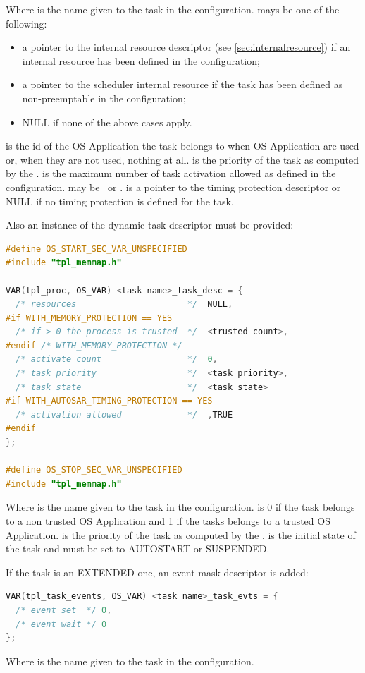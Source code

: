 Where  is the name given to the task in the configuration.  mays be one of the following:

\begin{itemize}
\item a pointer to the internal resource descriptor (see \ref{sec:internalresource}) if an internal resource has been defined in the configuration;
\item a pointer to the scheduler internal resource if the task has been defined as non-preemptable in the configuration;
\item NULL if none of the above cases apply.
\end{itemize}

 is the id of the OS Application the task belongs to when OS Application are used or, when they are not used, nothing at all.  is the priority of the task as computed by the \sysgen.  is the maximum number of task activation allowed as defined in the configuration.  may be \EXTENDED\ or \BASIC.  is a pointer to the timing protection descriptor or NULL if no timing protection is defined for the task.

Also an instance of the dynamic task descriptor must be provided:

\begin{lstlisting}[language=C]
#define OS_START_SEC_VAR_UNSPECIFIED
#include "tpl_memmap.h"

VAR(tpl_proc, OS_VAR) <task name>_task_desc = {
  /* resources                      */  NULL,
#if WITH_MEMORY_PROTECTION == YES
  /* if > 0 the process is trusted  */  <trusted count>,    
#endif /* WITH_MEMORY_PROTECTION */
  /* activate count                 */  0,
  /* task priority                  */  <task priority>,
  /* task state                     */  <task state>
#if WITH_AUTOSAR_TIMING_PROTECTION == YES
  /* activation allowed             */  ,TRUE
#endif
};

#define OS_STOP_SEC_VAR_UNSPECIFIED
#include "tpl_memmap.h"
\end{lstlisting}

Where  is the name given to the task in the configuration.  is 0 if the task belongs to a non trusted OS Application and 1 if the tasks belongs to a trusted OS Application.  is the priority of the task as computed by the \sysgen.  is the initial state of the task and must be set to AUTOSTART or SUSPENDED.

If the task is an EXTENDED one, an event mask descriptor is added:


\begin{lstlisting}[language=C]
VAR(tpl_task_events, OS_VAR) <task name>_task_evts = {
  /* event set  */ 0,
  /* event wait */ 0
};
\end{lstlisting}

Where  is the name given to the task in the configuration.

